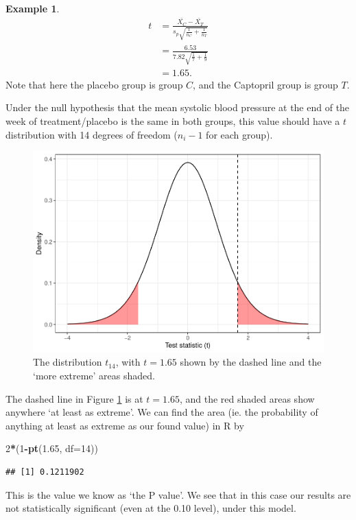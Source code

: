 \documentclass[
  openany]{book}
\newenvironment{Shaded}{\begin{snugshade}}{\end{snugshade}}
\newcommand{\AttributeTok}[1]{\textcolor[rgb]{0.13,0.29,0.53}{#1}}
\newcommand{\DecValTok}[1]{\textcolor[rgb]{0.00,0.00,0.81}{#1}}
\newcommand{\FloatTok}[1]{\textcolor[rgb]{0.00,0.00,0.81}{#1}}
\newcommand{\FunctionTok}[1]{\textcolor[rgb]{0.13,0.29,0.53}{\textbf{#1}}}
\newcommand{\NormalTok}[1]{#1}
\newcommand{\SpecialCharTok}[1]{\textcolor[rgb]{0.81,0.36,0.00}{\textbf{#1}}}
\theoremstyle{definition}
\theoremstyle{definition}
\newtheorem{example}{Example}[chapter]
\theoremstyle{definition}
\theoremstyle{definition}
\theoremstyle{remark}
\begin{document}
\begin{example}
\[
  \begin{aligned}
t & = \frac{\bar{X_C} - \bar{X_T}}{s_p\sqrt{\frac{1}{n_C} + \frac{1}{n_T}}}\\
& = \frac{6.53}{7.82\sqrt{\frac{1}{7} + \frac{1}{9}}} \\
& = 1.65.
\end{aligned}
\]
Note that here the placebo group is group \(C\), and the Captopril group is group \(T\).

Under the null hypothesis that the mean systolic blood pressure at the end of the week of treatment/placebo is the same in both groups, this value should have a \(t\) distribution with 14 degrees of freedom (\(n_i-1\) for each group).

\begin{figure}
\centering
\includegraphics{CT4H_notes_files/figure-latex/ttestcapt-1.pdf}
\caption{\label{fig:ttestcapt}The distribution \(t_{14}\), with \(t=1.65\) shown by the dashed line and the `more extreme' areas shaded.}
\end{figure}

The dashed line in Figure \ref{fig:ttestcapt} is at \(t=1.65\), and the red shaded areas show anywhere `at least as extreme'. We can find the area (ie. the probability of anything at least as extreme as our found value) in R by

\begin{Shaded}
\begin{Highlighting}[]
\DecValTok{2}\SpecialCharTok{*}\NormalTok{(}\DecValTok{1}\SpecialCharTok{{-}}\FunctionTok{pt}\NormalTok{(}\FloatTok{1.65}\NormalTok{, }\AttributeTok{df=}\DecValTok{14}\NormalTok{))}
\end{Highlighting}
\end{Shaded}

\begin{verbatim}
## [1] 0.1211902
\end{verbatim}

This is the value we know as `the P value'. We see that in this case our results are not statistically significant (even at the 0.10 level), under this model.
\end{example}
\end{document}
